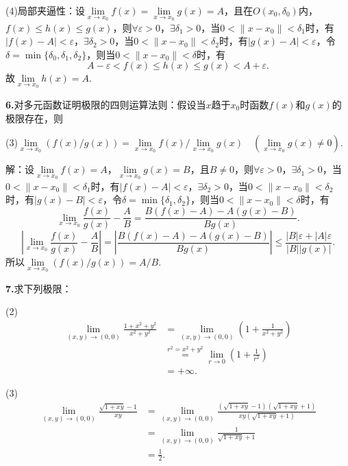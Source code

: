 \documentclass[12pt, a4paper]{article}
\begin{document}
(4)局部夹逼性：设\(\lim\limits_{x \to x_0} f(x) = \lim\limits_{x \to x_0} g(x) = A\)，且在\(O(x_0, \delta_0)\)内，\(f(x) \leq h(x) \leq g(x)\)，则\(\forall \varepsilon > 0\)，\(\exists \delta_1 > 0\)，当\(0 < \|x - x_0\| < \delta_1\)时，有\(|f(x) - A| < \varepsilon\)，\(\exists \delta_2 > 0\)，当\(0 < \|x - x_0\| < \delta_2\)时，有\(|g(x) - A| < \varepsilon\)，令\(\delta = \min\{\delta_0, \delta_1, \delta_2\}\)，则当\(0 < \|x - x_0\| < \delta\)时，有
\[A - \varepsilon < f(x) \leq h(x) \leq g(x) < A + \varepsilon.\]
故\(\lim\limits_{x \to x_0} h(x) = A\).

\textbf{6.}对多元函数证明极限的四则运算法则：假设当\(x\)趋于\(x_0\)时函数\(f(x)\)和\(g(x)\)的极限存在，则

(3)\(\lim\limits_{x \to x_0} (f(x) / g(x)) = \lim\limits_{x \to x_0} f(x) / \lim\limits_{x \to x_0} g(x) \quad (\lim\limits_{x \to x_0} g(x) \neq 0)\).

解：设\(\lim\limits_{x \to x_0} f(x) = A\)，\(\lim\limits_{x \to x_0} g(x) = B\)，且\(B \neq 0\)，则\(\forall \varepsilon > 0\)，\(\exists \delta_1 > 0\)，当\(0 < \|x - x_0\| < \delta_1\)时，有\(|f(x) - A| < \varepsilon\)，\(\exists \delta_2 > 0\)，当\(0 < \|x - x_0\| < \delta_2\)时，有\(|g(x) - B| < \varepsilon\)，令\(\delta = \min\{\delta_1, \delta_2\}\)，则当\(0 < \|x - x_0\| < \delta\)时，有
\[\lim_{x \to x_0} \dfrac{f(x)}{g(x)} - \frac{A}{B} = \frac{B(f(x) - A) - A(g(x) - B)}{Bg(x)}.\]
\[\left|\lim_{x \to x_0} \dfrac{f(x)}{g(x)} - \frac{A}{B}\right| = \left|\frac{B(f(x) - A) - A(g(x) - B)}{Bg(x)}\right| \leq \frac{|B|\varepsilon + |A|\varepsilon}{|B||g(x)|}.\]
所以\(\lim\limits_{x \to x_0} (f(x) / g(x)) = A / B\).

\textbf{7.}求下列极限：

(2)
\begin{align*}
\lim_{(x, y) \to (0, 0)} \frac{1 + x^2 + y^2}{x^2 + y^2} &= \lim_{(x, y) \to (0, 0)} \left(1 + \frac{1}{x^2 + y^2}\right) \\
&\overset{r^2 = x^2 + y^2}{=} \lim_{r \to 0} \left(1 + \frac{1}{r^2}\right) \\
&= +\infty.
\end{align*}

(3)
\begin{align*}
\lim_{(x, y) \to (0, 0)} \frac{\sqrt{1 + xy} - 1}{xy} &= \lim_{(x, y) \to (0, 0)} \frac{(\sqrt{1 + xy} - 1)(\sqrt{1 + xy} + 1)}{xy(\sqrt{1 + xy} + 1)} \\
&= \lim_{(x, y) \to (0, 0)} \frac{1}{\sqrt{1 + xy} + 1} \\
&= \frac{1}{2}.
\end{align*}
\end{document}
